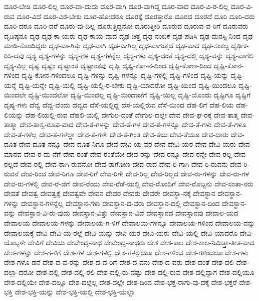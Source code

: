 {ದೂರ-ಬೇಡಿ
ದೂರ-ಲಿಲ್ಲ
ದೂರ-ವಾ-ದುದು
ದೂರ-ವಾಗಿ
ದೂರ-ವಾಗಿದ್ದ
ದೂರ-ವಾದ
ದೂರ-ವಿ-ರ-ಲಿಲ್ಲ
ದೂರ-ವಿ-ರುವ
ದೂರ-ವಿದೆ
ದೂರ-ವಿರ-ಬೇಕು
ದೂರ-ಹೋದರೂ
ದೂರಕ್ಕೆ
ದೂರತ್ತಾರೊ
ದೂರದ
ದೂರದೆ
ದೂರಿ
ದೂರಿ-ದರು
ದೂರಿ-ದರೂ
ದೂರಿ-ದರೆ
ದೂರು-ವು-ದಿಲ್ಲ
ದೂರುತ್ತಿದ್ದನೋ
ದೂರುತ್ತೀರಿ
ದೂರುವ
ದೂರುವ-ವ-ರಿಗೆ
ದೂರುವರು
ದೃಡಿಷ್ಠನೂ
ದೃಢ
ದೃಢ-ಕಾ-ಯರು
ದೃಢ-ಕಾಯ-ವಾದ
ದೃಢ-ಚಿತ್ತ
ದೃಢ-ನಂಬಿಕೆ
ದೃಢ-ಪಡಿಸಿ
ದೃಢ-ಮನಸ್ಸಿ-ನಿಂದ
ದೃಢ-ಮಾಡಿ-ಕೊಂದಿದ್ದರು
ದೃಢ-ವಾ-ಗಿತ್ತು
ದೃಢ-ವಾಗಿ
ದೃಢ-ವಾಗಿಲ್ಲ
ದೃಢ-ವಾಗುತ್ತದೆ
ದೃಢ-ವಾದ
ದೃಢ-ಸಂಕಲ್ಪ
ದೃಢೀಕ-ರಿಸಿ-ದವು
ದೃಶ್ಯ
ದೃಶ್ಯ-ಗಳನ್ನು
ದೃಶ್ಯ-ಗಳ
ದೃಶ್ಯ-ಗಳನ್ನೆಲ್ಲ
ದೃಶ್ಯ-ಗಳು
ದೃಶ್ಯ-ದಂತೆ
ದೃಶ್ಯ-ದಲ್ಲಿ
ದೃಶ್ಯ-ವನ್ನು
ದೃಶ್ಯ-ವಾಗಲಿ
ದೃಶ್ಯ-ವಿಲ್ಲ
ದೃಷ್ಟ
ದೃಷ್ಟಂ
ದೃಷ್ಟಾಂತ
ದೃಷ್ಟಾಂತವು
ದೃಷ್ಟಿ
ದೃಷ್ಟಿ-ಕೋ-ನ-ದಿಂದ
ದೃಷ್ಟಿ-ಕೋಣ-ದಿಂದ
ದೃಷ್ಟಿ-ಕೋನ-ಗಳಿಂದ
ದೃಷ್ಟಿ-ಕೋನ-ಗಳಿಂದಲೂ
ದೃಷ್ಟಿ-ಗಳನ್ನು
ದೃಷ್ಟಿ-ಗಳನ್ನೂ
ದೃಷ್ಟಿ-ಗಳಲ್ಲಿ
ದೃಷ್ಟಿ-ಗಳಿಂದ
ದೃಷ್ಟಿ-ಯನ್ನು
ದೃಷ್ಟಿ-ಯನ್ನೆ
ದೃಷ್ಟಿ-ಯನ್ನೇ
ದೃಷ್ಟಿ-ಯಲ್ಲಿ
ದೃಷ್ಟಿ-ಯಲ್ಲಿ-ರ-ಬೇಕು
ದೃಷ್ಟಿ-ಯಾದರೋ
ದೃಷ್ಟಿ-ಯಿಂದ
ದೃಷ್ಟಿ-ಯಿಂದಲೂ
ದೃಷ್ಟಿ-ಯಿಂದಲೇ
ದೃಷ್ಟಿ-ಯಿಂದಲೋ
ದೃಷ್ಟಿ-ಯಿಂದಲ್ಲ
ದೃಷ್ಟಿ-ಯಿಂದಾಚೆಗೆ
ದೃಷ್ಟಿ-ಯಿಲ್ಲ
ದೃಷ್ಟಿ-ಯೊಂದು
ದೃಷ್ಟಿಗೂ
ದೃಷ್ಟಿಗೆ
ದೃಷ್ಯ-ಗಳು
ದೆವ್ವ
ದೆವ್ವ-ವೆಂದು
ದೆವ್ವದ
ದೆಸೆ-ಯಲ್ಲಿದ್ದ
ದೆಸೆ-ಯಲ್ಲಿರುವ
ದೆಸೆ-ಯಿಂದ
ದೆಹ-ಲಿಗೆ
ದೆಹ-ಲಿಯ
ದೆಹ-ಲಿಯನ್ನು
ದೆಹ-ಲಿಯಲ್ಲಿ-ರುವ
ದೆಹಲಿ-ಯಲ್ಲಿ
ದೇಗುಲ-ದಂತೆ
ದೇಗುಲ-ದಲ್ಲೇ
ದೇವ
ದೇವ-ಘ-ರಕ್ಕೆ
ದೇವ-ತಾತ್ಮ
ದೇವ-ತಾತ್ಮಾ
ದೇವ-ತಾಸ್ವ-ರೂಪ-ವಾದ
ದೇವ-ತೆ-ಗಳನ್ನು
ದೇವ-ತೆ-ಗಳ
ದೇವ-ತೆ-ಗಳನ್ನೂ
ದೇವ-ತೆ-ಗಳು
ದೇವ-ತೆ-ಗಳೂ
ದೇವ-ತೆ-ಗಳೆಲ್ಲ
ದೇವ-ತೆ-ಗಳೆಲ್ಲಾ
ದೇವ-ತೆ-ಗಳೇ
ದೇವ-ತೆ-ಗಿಂತ
ದೇವ-ತೆಯ
ದೇವ-ತೆಯೂ
ದೇವ-ದಾರು
ದೇವ-ದೂತ
ದೇವ-ದೂತ-ನನ್ನೂ
ದೇವ-ದೂತ-ನಿಗೂ
ದೇವ-ದೇವಿ-ಯ-ವರ
ದೇವ-ದೇವಿ-ಯರ
ದೇವ-ದೇವಿ-ಯರು
ದೇವ-ಮಾನವ
ದೇವ-ರ-ಮ-ನೆಗೆ
ದೇವ-ರಂತೆ
ದೇವ-ರಂತೆಯೇ
ದೇವ-ರನ್ನು
ದೇವ-ರನ್ನೂ
ದೇವ-ರನ್ನೇ
ದೇವ-ರಲ್ಲ
ದೇವ-ರಲ್ಲದೆ
ದೇವ-ರಲ್ಲಿ
ದೇವ-ರಾಗಿ-ರುವನೋ
ದೇವ-ರಾಗೋಣ
ದೇವ-ರಾದ
ದೇವ-ರಿ-ಗಾಗಿ
ದೇವ-ರಿ-ರುವನು
ದೇವ-ರಿ-ರುವನೆ
ದೇವ-ರಿಂದ
ದೇವ-ರಿಗೂ
ದೇವ-ರಿಗೆ
ದೇವ-ರಿಗೇ
ದೇವ-ರಿಲ್ಲ
ದೇವ-ರಿಲ್ಲದ
ದೇವ-ರು-ಗಳನ್ನು
ದೇವ-ರು-ಗಳ
ದೇವ-ರು-ಗಳಲ್ಲಿ
ದೇವ-ರೆ-ಡೆಗೆ
ದೇವ-ರೆಂದು
ದೇವ-ರೆಡೆ-ಯಲ್ಲಿ
ದೇವ-ರೊಂದಿಗೆ
ದೇವ-ರೊಬ್ಬನು
ದೇವ-ಸಂತಾ-ನರು
ದೇವತೆ
ದೇವತ್ವ
ದೇವತ್ವಕ್ಕೆ
ದೇವತ್ವವೇ
ದೇವನ
ದೇವರ
ದೇವರು
ದೇವರೇ
ದೇವಸ್ಥಾ-ನಕ್ಕೆ
ದೇವಸ್ಥಾನ
ದೇವಸ್ಥಾನ-ಗಳನ್ನು
ದೇವಸ್ಥಾನ-ಗಳನ್ನೆಲ್ಲ
ದೇವಸ್ಥಾನ-ಗಳು
ದೇವಸ್ಥಾನ-ದ-ವರು
ದೇವಸ್ಥಾನ-ದಲ್ಲಿ
ದೇವಸ್ಥಾನ-ದಿಂದ
ದೇವಸ್ಥಾನ-ವನ್ನು
ದೇವಸ್ಥಾನ-ವಿ-ರು-ವುದು
ದೇವಸ್ಥಾನ-ವಿತ್ತು
ದೇವಸ್ಥಾನ-ವಿದೆ
ದೇವಸ್ಥಾನದ
ದೇವಸ್ಥಾನವು
ದೇವಾಲ-ಯದ
ದೇವಾಲಯ
ದೇವಾಲಯ-ಗಳನ್ನು
ದೇವಾಲಯ-ಗ-ಳಿಗೆ
ದೇವಾಲಯ-ಗಳನ್ನೂ
ದೇವಾಲಯ-ಗಳಿಂದ
ದೇವಾಲಯ-ವನ್ನು
ದೇವಾಲಯಕ್ಕೆ
ದೇವಿ
ದೇವಿ-ಯ-ರಲ್ಲೆ
ದೇವಿ-ಯನ್ನು
ದೇವಿ-ಯರ
ದೇವಿ-ಯರು
ದೇವಿ-ಯಲ್ಲಿ
ದೇವಿ-ಯಾದರೊ
ದೇವಿ-ಯೊಬ್ಬಳೇ
ದೇವಿಗೆ
ದೇವಿಯ
ದೇವೇಂದ್ರ-ನಾಥ
ದೇವೇಂದ್ರ-ನಾಥರು
ದೇಶ
ದೇಶ-ಕಾಲ
ದೇಶ-ಕಾಲ-ನಿಮಿತ್ತಾ-ತೀತ-ವಾದ
ದೇಶ-ಗಳನ್ನು
ದೇಶ-ಗ-ಳಿಗೆ
ದೇಶ-ಗಳ
ದೇಶ-ಗಳಲ್ಲಿ
ದೇಶ-ಗಳಲ್ಲಿಯೂ
ದೇಶ-ಗಳಿಂದ
ದೇಶ-ಗಳಿಂದಲೂ
ದೇಶ-ಗಳು
ದೇಶ-ಗಳೊ-ಡನೆ
ದೇಶ-ದ-ವ-ರನ್ನು
ದೇಶ-ದ-ವ-ರಿಗೆ
ದೇಶ-ದ-ವನು
ದೇಶ-ದ-ವರು
ದೇಶ-ದಂತೆ
ದೇಶ-ದಲಿ
ದೇಶ-ದಲ್ಲಾ-ದರೋ
ದೇಶ-ದಲ್ಲಿ
ದೇಶ-ದಲ್ಲಿ-ರಲಿ
ದೇಶ-ದಲ್ಲಿ-ರು-ವಷ್ಟು
ದೇಶ-ದಲ್ಲಿ-ರುವ
ದೇಶ-ದಲ್ಲಿದ್ದಾಗ
ದೇಶ-ದಲ್ಲಿಯೂ
ದೇಶ-ದಲ್ಲಿಯೇ
ದೇಶ-ದಲ್ಲೂ
ದೇಶ-ದಲ್ಲೆಲ್ಲ
ದೇಶ-ದಲ್ಲೇ
ದೇಶ-ದಿಂದ
ದೇಶ-ಭಕ್ತ-ರಾಗು-ವು-ದಕ್ಕೆ
ದೇಶ-ಭಕ್ತರೆ
ದೇಶ-ಭಕ್ತಿ
ದೇಶ-ಭಕ್ತಿ-ಯನ್ನು
ದೇಶ-ಭಕ್ತಿ-ಯಲ್ಲಿ
ದೇಶ-ಭಕ್ತಿ-ಯೆಲ್ಲಾ
}
